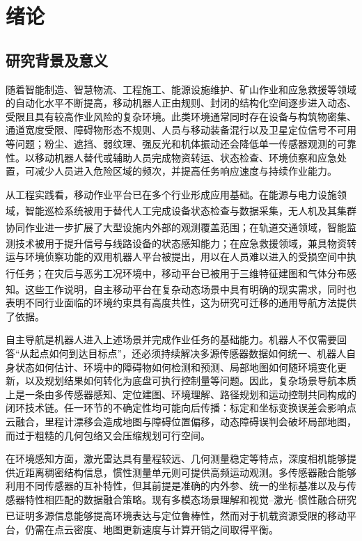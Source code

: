 \chapter{绪论}
\section{研究背景及意义}
随着智能制造、智慧物流、工程施工、能源设施维护、矿山作业和应急救援等领域的自动化水平不断提高，移动机器人正由规则、封闭的结构化空间逐步进入动态、受限且具有较高作业风险的复杂环境。此类环境通常同时存在设备与构筑物密集、通道宽度受限、障碍物形态不规则、人员与移动装备混行以及卫星定位信号不可用等问题；粉尘、遮挡、弱纹理、强反光和机体振动还会降低单一传感器观测的可靠性。以移动机器人替代或辅助人员完成物资转运、状态检查、环境侦察和应急处置，可减少人员进入危险区域的频次，并提高任务响应速度与持续作业能力。

从工程实践看，移动作业平台已在多个行业形成应用基础。在能源与电力设施领域，智能巡检系统被用于替代人工完成设备状态检查与数据采集\textsuperscript{\cite{ZDHT202511062}}，无人机及其集群协同作业进一步扩展了大型设施内外部的观测覆盖范围\textsuperscript{\cite{ZLXC202503030,10753839}}；在轨道交通领域，智能监测技术被用于提升信号与线路设备的状态感知能力\textsuperscript{\cite{7105029}}；在应急救援领域，兼具物资转运与环境侦察功能的双用机器人平台被提出，用以在人员难以进入的受损空间中执行任务\textsuperscript{\cite{HUJX202504006}}；在灾后与恶劣工况环境中，移动平台已被用于三维特征建图和气体分布感知\textsuperscript{\cite{5354363,8822727}}。这些工作说明，自主移动平台在复杂动态场景中具有明确的现实需求，同时也表明不同行业面临的环境约束具有高度共性，这为研究可迁移的通用导航方法提供了依据。

自主导航是机器人进入上述场景并完成作业任务的基础能力。机器人不仅需要回答“从起点如何到达目标点”，还必须持续解决多源传感器数据如何统一、机器人自身状态如何估计、环境中的障碍物如何检测和预测、局部地图如何随环境变化更新，以及规划结果如何转化为底盘可执行控制量等问题。因此，复杂场景导航本质上是一条由多传感器感知、定位建图、环境理解、路径规划和运动控制共同构成的闭环技术链。任一环节的不确定性均可能向后传播：标定和坐标变换误差会影响点云融合，里程计漂移会造成地图与障碍位置偏移，动态障碍误判会破坏局部地图，而过于粗糙的几何包络又会压缩规划可行空间。

在环境感知方面，激光雷达具有量程较远、几何测量稳定等特点，深度相机能够提供近距离稠密结构信息，惯性测量单元则可提供高频运动观测。多传感器融合能够利用不同传感器的互补特性，但其前提是准确的内外参、统一的坐标基准以及与传感器特性相匹配的数据融合策略。现有多模态场景理解和视觉--激光--惯性融合研究已证明多源信息能够提高环境表达与定位鲁棒性\textsuperscript{\cite{10856442,10475560}}，然而对于机载资源受限的移动平台，仍需在点云密度、地图更新速度与计算开销之间取得平衡。

